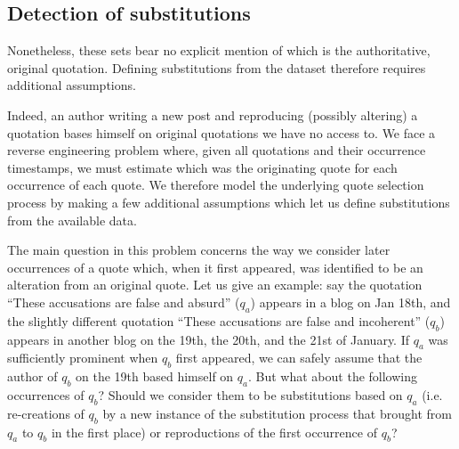\subsection{Detection of substitutions}

Nonetheless, these sets bear no explicit mention of which is the authoritative, original quotation.  Defining substitutions from the dataset therefore requires additional assumptions.  

Indeed, an author writing a new post and reproducing (possibly altering) a quotation bases himself on original quotations we have no access to. We face a reverse engineering problem where, given all quotations and their occurrence timestamps, we must estimate which was the originating quote for each occurrence of each quote. We therefore model the underlying quote selection process by making a few additional assumptions which let us define substitutions from the available data.

The main question in this problem concerns the way we consider later occurrences of a quote which, when it first appeared, was identified to be an alteration from an original quote. Let us give an example: say the quotation ``These accusations are false and absurd'' ($q_a$) appears in a blog on Jan 18th, and the slightly different quotation ``These accusations are false and incoherent'' ($q_b$) appears in another blog on the 19th, the 20th, and the 21st of January. If $q_a$ was sufficiently prominent when $q_b$ first appeared, we can safely assume that the author of $q_b$ on the 19th based himself on $q_a$. But what about the following occurrences of $q_b$? Should we consider them to be substitutions based on $q_a$ (i.e. re-creations of $q_b$ by a new instance of the substitution process that brought from $q_a$ to $q_b$ in the first place) or reproductions of the first occurrence of $q_b$?

